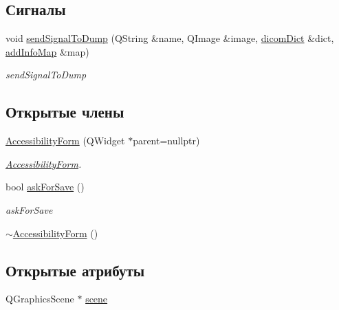 \subsection*{Сигналы}
\begin{DoxyCompactItemize}
\item 
void \hyperlink{classAccessibilityForm_abd079103500734db443b13a5f177938c}{send\+Signal\+To\+Dump} (Q\+String \&name, Q\+Image \&image, \hyperlink{tagshelpers_8h_ae25d30658f61420b88a380dc9e40bb74}{dicom\+Dict} \&dict, \hyperlink{dbform_8h_a1ec1a645f41e1c6544d384ca863a936c}{add\+Info\+Map} \&map)
\begin{DoxyCompactList}\small\item\em send\+Signal\+To\+Dump \end{DoxyCompactList}\end{DoxyCompactItemize}
\subsection*{Открытые члены}
\begin{DoxyCompactItemize}
\item 
\hyperlink{classAccessibilityForm_aed3d56ba8bea5e204065b33aeabc501f}{Accessibility\+Form} (Q\+Widget $\ast$parent=nullptr)
\begin{DoxyCompactList}\small\item\em \hyperlink{classAccessibilityForm}{Accessibility\+Form}. \end{DoxyCompactList}\item 
bool \hyperlink{classAccessibilityForm_a8c465f42556cfec6742dc973e8f3580b}{ask\+For\+Save} ()
\begin{DoxyCompactList}\small\item\em ask\+For\+Save \end{DoxyCompactList}\item 
\hyperlink{classAccessibilityForm_a35c94d7857e2a4db9a8fe5c60ecc8e64}{$\sim$\+Accessibility\+Form} ()
\end{DoxyCompactItemize}
\subsection*{Открытые атрибуты}
\begin{DoxyCompactItemize}
\item 
Q\+Graphics\+Scene $\ast$ \hyperlink{classAccessibilityForm_a5ce983d3b40e1486857d263b11fda575}{scene}
\end{DoxyCompactItemize}
